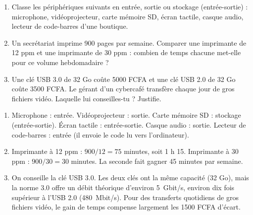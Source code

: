 \documentclass[11pt]{article}
\begin{document}
\begin{exercice}
\begin{enumerate}
\item Classe les périphériques suivants en entrée, sortie ou stockage (entrée-sortie) : microphone, vidéoprojecteur, carte mémoire SD, écran tactile, casque audio, lecteur de code-barres d'une boutique.
\item Un secrétariat imprime 900 pages par semaine. Comparer une imprimante de 12 ppm et une imprimante de 30 ppm : combien de temps chacune met-elle pour ce volume hebdomadaire ?
\item Une clé USB 3.0 de 32 Go coûte 5000 FCFA et une clé USB 2.0 de 32 Go coûte 3500 FCFA. Le gérant d'un cybercafé transfère chaque jour de gros fichiers vidéo. Laquelle lui conseilles-tu ? Justifie.
\end{enumerate}
\end{exercice}

\begin{corrige}[Exercice n° 1]
\begin{enumerate}
\item Microphone : entrée. Vidéoprojecteur : sortie. Carte mémoire SD : stockage (entrée-sortie). Écran tactile : entrée-sortie. Casque audio : sortie. Lecteur de code-barres : entrée (il envoie le code lu vers l'ordinateur).
\item Imprimante à 12 ppm : $900 / 12 = 75$ minutes, soit 1 h 15. Imprimante à 30 ppm : $900 / 30 = 30$ minutes. La seconde fait gagner 45 minutes par semaine.
\item On conseille la clé USB 3.0. Les deux clés ont la même capacité (32 Go), mais la norme 3.0 offre un débit théorique d'environ \SI{5}{Gbit/s}, environ dix fois supérieur à l'USB 2.0 (\SI{480}{Mbit/s}). Pour des transferts quotidiens de gros fichiers vidéo, le gain de temps compense largement les 1500 FCFA d'écart.
\end{enumerate}
\end{corrige}
\end{document}
